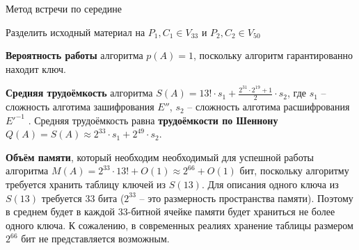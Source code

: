 \documentclass[a4paper,12pt]{article}
\theoremstyle{definition}
\begin{document}
	\begin{algorithm}[H]
		
		\caption{Метод встречи по середине}
		\label{alg:Midle}
		\SetAlgoNoEnd
		
		
		Разделить исходный материал на $P_1, C_1 \in V_{33}$ и $P_2, C_2 \in V_{50}$
		

	
	\end{algorithm}	
	
	
	\textbf{Вероятность работы} алгоритма $p(A)=1$, поскольку алгоритм гарантированно находит ключ. 
	
	\textbf{Средняя трудоёмкость} алгоритма $S(A)= 13! \cdot s_1 + \frac{2^{31} \cdot 2^{19} + 1}{2} \cdot s_2 $, где $s_1$ -- сложность алготима зашифрования $E''$, $s_2$ -- сложность алготима расшифрования $E'^{-1}$ . Средняя трудоёмкость равна \textbf{трудоёмкости по Шеннону} $Q(A) = S(A) \approx 2^{33} \cdot s_1 + 2^{49} \cdot s_2$.
	
	\textbf{Объём памяти}, который необходим необходимый для успешной работы алгоритма $M(A) = 2^{33} \cdot 13! + O(1) \approx 2^{66} + O(1)$ бит, поскольку алгоритму требуется хранить таблицу ключей из $S(13)$. Для описания одного ключа из $S(13)$ требуется 33 бита ($2^{33}$ -- это размерность пространства памяти). Поэтому в среднем будет в каждой 33-битной ячейке памяти будет храниться не более одного ключа. К сожалению, в современных реалиях хранение таблицы размером $2^{66}$ бит не представляется возможным.
	
\end{document}
